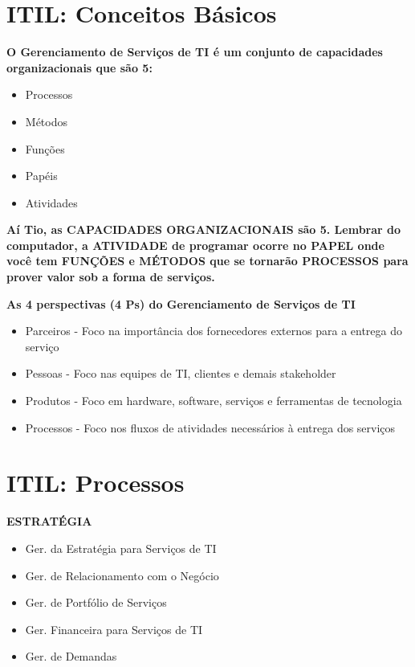 
\section{ITIL: Conceitos Básicos}

\textbf{O Gerenciamento de Serviços de TI é um conjunto de capacidades organizacionais que são 5:} 
\begin{itemize}
	\item Processos
	\item Métodos
	\item Funções
	\item Papéis
	\item Atividades
\end{itemize}

\textbf{Aí Tio, as CAPACIDADES ORGANIZACIONAIS são 5. Lembrar do computador, a ATIVIDADE de programar ocorre no PAPEL onde você tem FUNÇÕES e MÉTODOS que se tornarão PROCESSOS para prover valor sob a forma de serviços.}

\textbf{As 4 perspectivas (4 Ps) do Gerenciamento de Serviços de TI} 
\begin{itemize}
\item Parceiros - Foco na importância dos fornecedores externos para a entrega do serviço 
\item Pessoas - Foco nas equipes de TI, clientes e demais stakeholder
\item Produtos - Foco em hardware, software, serviços e ferramentas de tecnologia
\item Processos - Foco nos fluxos de atividades necessários à entrega dos serviços
\end{itemize}


\section{ITIL: Processos}

\textbf{ESTRATÉGIA}
\begin{itemize}
	\item Ger. da Estratégia para Serviços de TI
	\item Ger. de Relacionamento com o Negócio
	\item Ger. de Portfólio de Serviços
	\item Ger. Financeira para Serviços de TI
	\item Ger. de Demandas
\end{itemize}

